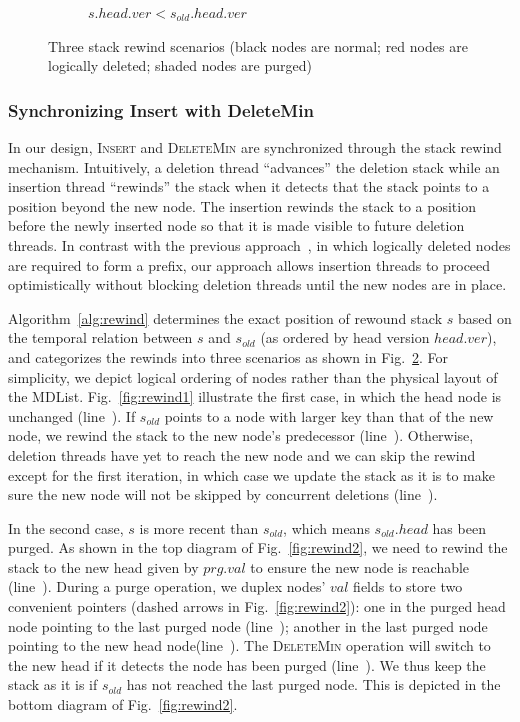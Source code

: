 \documentclass[10pt,journal,letter,compsoc]{IEEEtran}
\begin{document}
\begin{figure}[t]
\begin{subfigure}{0.33\textwidth}
        \caption{$s.head.ver < s_{old}.head.ver$}
        \label{fig:rewind3}
    \end{subfigure}
    \caption{Three stack rewind scenarios (black nodes are normal; red nodes are logically deleted; shaded nodes are purged)}
    \label{fig:rewind}
    \vspace{-0.15in}
\end{figure}
 
\subsubsection{Synchronizing Insert with DeleteMin}
\label{sec:cpqueuerewind}
In our design, \textsc{Insert} and \textsc{DeleteMin} are synchronized through the stack rewind mechanism.
Intuitively, a deletion thread ``advances'' the deletion stack while an insertion thread ``rewinds'' the stack when it detects that the stack points to a position beyond the new node. 
The insertion rewinds the stack to a position before the newly inserted node so that it is made visible to future deletion threads. 
In contrast with the previous approach~\cite{linden2013skiplist}, in which logically deleted nodes are required to form a prefix, our approach allows insertion threads to proceed optimistically without blocking deletion threads until the new nodes are in place. 

Algorithm~\ref{alg:rewind} determines the exact position of rewound stack $s$ based on the temporal relation between $s$ and $s_{old}$ (as ordered by head version $head.ver$), and categorizes the rewinds into three scenarios as shown in Fig.~\ref{fig:rewind}.
For simplicity, we depict logical ordering of nodes rather than the physical layout of the MDList.
Fig.~\ref{fig:rewind1} illustrate the first case, in which the head node is unchanged (line~).
If $s_{old}$ points to a node with larger key than that of the new node, we rewind the stack to the new node's predecessor (line~).
Otherwise, deletion threads have yet to reach the new node and we can skip the rewind except for the first iteration, in which case we update the stack as it is to make sure the new node will not be skipped by concurrent deletions (line~).

In the second case, $s$ is more recent than $s_{old}$, which means $s_{old}.head$ has been purged.
As shown in the top diagram of Fig.~\ref{fig:rewind2}, we need to rewind the stack to the new head given by $prg.val$ to ensure the new node is reachable (line~).
During a purge operation, we duplex nodes' $val$ fields to store two convenient pointers (dashed arrows in Fig.~\ref{fig:rewind2}): one in the purged head node pointing to the last purged node (line~); another in the last purged node pointing to the new head node(line~).
The \textsc{DeleteMin} operation will switch to the new head if it detects the node has been purged (line~).
We thus keep the stack as it is if $s_{old}$ has not reached the last purged node. 
This is depicted in the bottom diagram of Fig.~\ref{fig:rewind2}.
\end{document}
